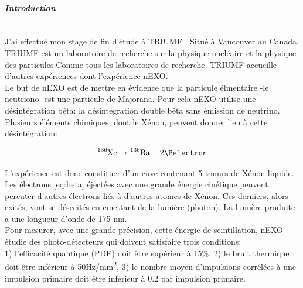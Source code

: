 \documentclass[a4paper, 11pt]{report}%
\newcommand{\TR}{TRIUMF }
\begin{document}




\newpage
\thispagestyle{empty}

\paragraph{\textit{\underline{Introduction}}}
  \leavevmode
  \\
  
  J'ai effectu\'e mon stage de fin d'\'etude \`a \TR. Situ\'e \`a Vancouver au Canada, \TR est un laboratoire de recherche sur la physique 
  nucl\'eaire et la physique des particules.Comme tous les laboratoires de recherche, \TR accueille d'autres exp\'eriences dont 
  l'exp\'erience nEXO.\\
  
  Le but de nEXO est de mettre en \'evidence que la particule \'elmentaire -le neutriono- est une particule de Majorana. Pour cela nEXO 
  utilise une d\'esint\'egration b\^eta: la d\'esint\'egration double b\^eta sans \'emission de neutrino. Plusieurs \'el\'ements chimiques, dont le 
  X\'enon, peuvent donner lieu \`a cette d\'esint\'egration: 
  
  \begin{equation}\label{eq:beta}
    \ce{^{136}Xe} \rightarrow \ce{^{136}Ba} + 2\Pelectron
  \end{equation}

  L'exp\'erience est donc constituer d'un cuve contenant 5 tonnes de X\'enon liquide. Les \'electrons \ref{eq:beta} \'eject\'ees avec une grande 
  \'energie cin\'etique peuvent percuter d'autres \'electrons li\'es \`a d'autres atomes de X\'enon. Ces derniers, alors exit\'es, vont se d\'esecit\'es
  en emettant de la lumi\`ere (photon). La lumi\`ere produite a une longueur d'onde de 175 nm. 
  \\
  
  Pour mesurer, avec une grande pr\'ecision, 
  cette \'energie de scintillation, nEXO \'etudie des photo-d\'etecteurs qui doivent satisfaire trois conditions:\\
  1) l'efficacit\'e quantique (PDE) doit \^etre sup\'erieur \`a 15$\%$, 2) le bruit thermique doit \^etre inf\'erieur \`a 50Hz/mm\textsuperscript{2},
  3) le nombre moyen d'impulsions corr\'el\'ees \`a une impulsion primaire doit \^etre inf\'erieur \`a 0.2 par impulsion primaire. 
  \\
  
\end{document}
